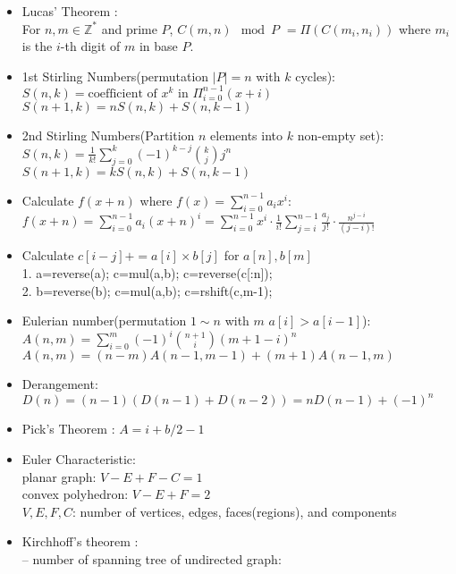 \begin{itemize}[leftmargin=*]
\setlength\itemsep{0.2em}
\item Lucas’ Theorem :\\
  For $n, m \in \mathbb{Z}^{*}$ and prime $P$,
  $C(m,n) \mod P$
	$= \Pi ( C(m_i,n_i) )$
	where $m_i$ is the $i$-th digit of $m$ in base $P$.
\item 1st Stirling Numbers(permutation $|P|=n$ with $k$ cycles): \\
  $S(n,k) = \text{coefficient of }x^k \text{ in } \Pi_{i=0}^{n-1} (x+i)$ \\
  $S(n+1,k) = nS(n,k)+S(n,k-1)$
\item 2nd Stirling Numbers(Partition $n$ elements into $k$ non-empty set): \\
  $S(n,k) = \frac{1}{k!} \sum\limits_{j=0}^k (-1)^{k-j} {k \choose j} j^n$ \\
  $S(n+1,k) = kS(n,k)+S(n,k-1)$
\item Calculate $f(x+n)$ where $f(x)=\sum\limits_{i=0}^{n-1}a_ix^i$: \\
  $f(x+n)=\sum\limits_{i=0}^{n-1}a_i(x+n)^i=\sum\limits_{i=0}^{n-1}x^i\cdot\frac{1}{i!}\sum\limits_{j=i}^{n-1}\frac{a_j}{j!}\cdot\frac{n^{j-i}}{(j-i)!}$
\item Calculate $c[i-j]+=a[i]\times b[j]$ for $a[n],b[m]$ \\
  1. a=reverse(a); c=mul(a,b); c=reverse(c[:n]); \\
  2. b=reverse(b); c=mul(a,b); c=rshift(c,m-1); 
\item Eulerian number(permutation $1\sim n$ with $m$ $a[i]>a[i-1]$): \\
  $A(n,m)=\sum\limits_{i=0}^{m}(-1)^i {n+1\choose i} (m+1-i)^n $ \\
  $A(n,m)=(n-m)A(n-1,m-1)+(m+1)A(n-1,m)$
\item Derangement: \\
  $D(n)=(n-1)(D(n-1)+D(n-2))=nD(n-1)+(-1)^n$
\item Pick’s Theorem : $A = i + b/2 - 1$
\item Euler Characteristic: \\
  planar graph: $V-E+F-C=1$ \\
  convex polyhedron: $V-E+F=2$ \\
  $V,E,F,C$: number of vertices, edges, faces(regions), and components
\item Kirchhoff's theorem :\\
  -- number of spanning tree of undirected graph:\\

\end{itemize}
